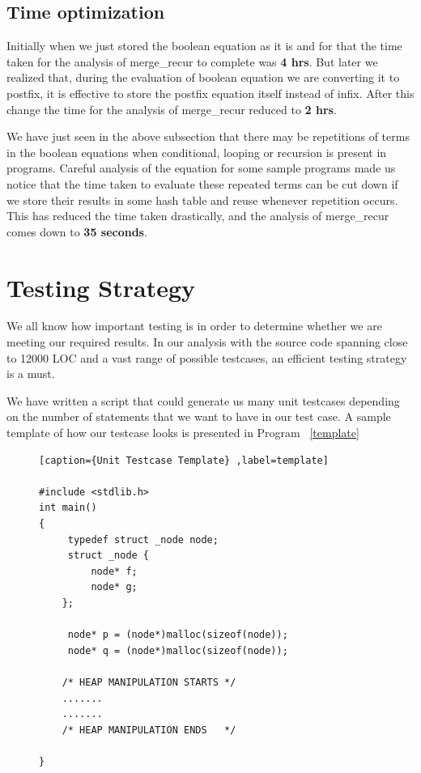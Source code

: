 \subsection{Time optimization}

Initially when we just stored the  boolean equation as it is and for that the  time taken for the analysis 
of merge\_recur to complete was \textbf{4 hrs}. But later we realized that, during the evaluation of boolean equation we are converting it to postfix, 
it is effective to store the postfix equation itself instead of infix. After this change the time for the analysis 
of merge\_recur reduced to \textbf{2 hrs}.

We have just seen in the above subsection that there may be repetitions of
terms in the boolean equations when conditional, looping or recursion is present in programs. Careful analysis of the equation for some sample programs 
made us notice that the time taken to evaluate these repeated terms can be cut down if we store their results in  some hash table and reuse 
whenever repetition occurs. This has reduced the time taken drastically, and the analysis of merge\_recur comes down to \textbf{35 seconds}.

\section{Testing Strategy}
We all know how important testing is in order to determine whether we are meeting our required results. In our analysis with the source code 
spanning close to 12000 LOC and a vast range of possible testcases, an efficient testing strategy is a must. 
  
We have written a script that could generate us many unit testcases depending on the number of statements that we want to have in our test case.
A sample template of how our testcase looks is presented in Program ~\ref{template}

\begin{figure}
\begin{lstlisting}[caption={Unit Testcase Template} ,label=template]
 
#include <stdlib.h>
int main()
{
	 typedef struct _node node;
	 struct _node {
		 node* f;
		 node* g;
	};

	 node* p = (node*)malloc(sizeof(node));
	 node* q = (node*)malloc(sizeof(node));

	/* HEAP MANIPULATION STARTS */
	.......
	.......
	/* HEAP MANIPULATION ENDS   */

}
\end{lstlisting}
\end{figure}
     
